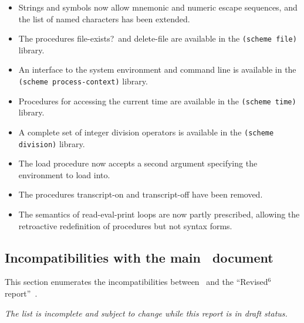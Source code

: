 \begin{itemize}
\item Strings and symbols now allow mnemonic and numeric escape
sequences, and the list of named characters has been extended.

\item The procedures {\cf file-exists?}\ and {\cf delete-file} are available in the
{\tt (scheme file)} library.

\item An interface to the system environment and command line is
available in the {\tt (scheme process-context)} library.

\item Procedures for accessing the current time are available in the
{\tt (scheme time)} library.

\item A complete set of integer division operators is available in the
{\tt (scheme division)} library.

\item The {\cf load} procedure now accepts a second argument specifying the environment to
load into.

\item The procedures {\cf transcript-on} and {\cf transcript-off} have been removed.

\item The semantics of read-eval-print loops are now partly prescribed,
allowing the retroactive redefinition of procedures but not syntax forms.

\end{itemize}

\subsection*{Incompatibilities with the main \rsixrs\ document}
This section enumerates the incompatibilities between \rsevenrs~and
the ``Revised$^6$ report''~\cite{R6RS}.

{\em The list is incomplete and subject to change while this report is in draft status.}


